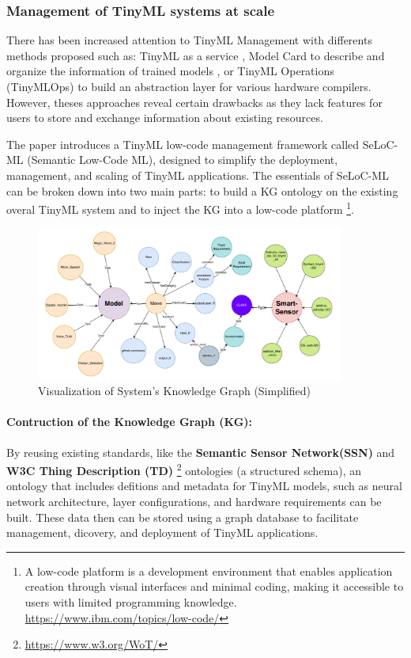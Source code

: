 \documentclass[twocolumn]{article}
\begin{document}
\subsubsection{Management of TinyML systems at scale}

There has been increased attention to TinyML Management with differents methods proposed such as: TinyML as a service , Model Card to describe and organize the information of trained models \cite{mitchell_model_2019}, or TinyML Operations (TinyMLOps) \cite{antonini_tiny-mlops_2022} to build an abstraction layer for various hardware compilers. However, theses approaches reveal certain drawbacks as they lack features for users to store and exchange information about existing resources. 

The paper introduces a TinyML low-code management framework called SeLoC-ML (Semantic Low-Code ML), designed to simplify the deployment, management, and scaling of TinyML applications. The essentials of SeLoC-ML can be broken down into two main parts: to build a KG ontology on the existing overal TinyML system and to inject the KG into a low-code platform \footnote{A low-code platform is a development environment that enables application creation through visual interfaces and minimal coding, making it accessible to users with limited programming knowledge. \url{https://www.ibm.com/topics/low-code/}}. 


\begin{figure}[t]
	\centerline{
	\includegraphics[width=0.9\textwidth]{resource/KG.pdf}
	}
	\caption{Visualization of System's Knowledge Graph (Simplified)}
	\label{KG}
\end{figure}


\paragraph{Contruction of the Knowledge Graph (KG):} 

By reusing existing standards, like the \textbf{Semantic Sensor Network(SSN)} and \textbf{W3C Thing Description (TD)}  \footnote{\url{https://www.w3.org/WoT/}}
ontologies (a structured schema), an ontology that includes defitions and metadata for TinyML models, such as neural network architecture, layer configurations, and hardware requirements can be built. These data then can be stored using a graph database to facilitate management, dicovery, and deployment of TinyML applications.
\end{document}
